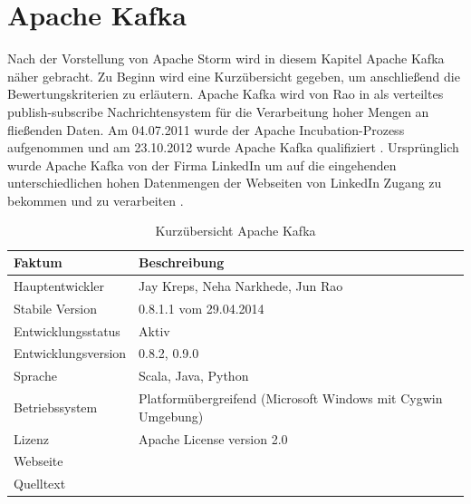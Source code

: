 \section{Apache Kafka}

Nach der Vorstellung von Apache Storm wird in diesem Kapitel Apache Kafka näher gebracht. Zu Beginn wird eine Kurzübersicht gegeben, um anschließend die Bewertungskriterien zu erläutern. Apache Kafka wird von Rao in  als verteiltes publish-subscribe Nachrichtensystem für die Verarbeitung hoher Mengen an fließenden Daten. Am 04.07.2011 wurde der Apache Incubation-Prozess aufgenommen und am 23.10.2012 wurde Apache Kafka qualifiziert . Ursprünglich wurde Apache Kafka von der Firma LinkedIn  um auf die eingehenden unterschiedlichen hohen Datenmengen der Webseiten von LinkedIn Zugang zu bekommen und zu verarbeiten .

\begin{table}[htbp]
	\centering
		\begin{tabular}{@{}ll@{}} \toprule
			\textbf{Faktum} & \textbf{Beschreibung} \\ \midrule
			Hauptentwickler & Jay Kreps, Neha Narkhede, Jun Rao \\
			Stabile Version & 0.8.1.1 vom 29.04.2014 \\ 
			Entwicklungsstatus &  Aktiv \\
			Entwicklungsversion & 0.8.2, 0.9.0 \\
			Sprache & Scala, Java, Python \\
			Betriebssystem & Platformübergreifend (Microsoft Windows mit Cygwin Umgebung) \\
			Lizenz & Apache License version 2.0 \\
			Webseite & \citeint{kafka:home} \\
			Quelltext & \citeint{kafka:GitHubApacheMirror} \\			
			\bottomrule			
		\end{tabular}
	\caption{Kurzübersicht Apache Kafka}
	\label{tab:vorkafka}
\end{table}

